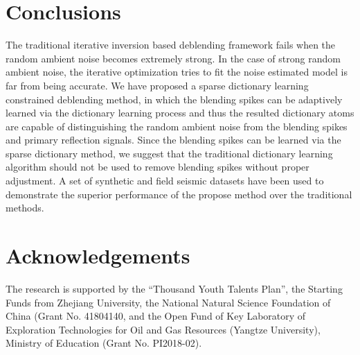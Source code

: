 \section{Conclusions}
The traditional iterative inversion based deblending framework fails when the random ambient noise becomes extremely strong. In the case of strong random ambient noise, the iterative optimization tries to fit the noise estimated model is far from being accurate. We have proposed a sparse dictionary learning constrained deblending method, in which the blending spikes can be adaptively learned via the dictionary learning process and thus the resulted dictionary atoms are capable of distinguishing the random ambient noise from the blending spikes and primary reflection signals. Since the blending spikes can be learned via the sparse dictionary method, we suggest that the traditional dictionary learning algorithm should not be used to remove blending spikes without proper adjustment. A set of synthetic and field seismic datasets have been used to demonstrate the superior performance of the propose method over the traditional methods. 


\section{Acknowledgements}
The research is supported by the “Thousand Youth Talents Plan”, the Starting Funds from Zhejiang University, the National Natural Science Foundation of China (Grant No. 41804140, and the Open Fund of Key Laboratory of Exploration Technologies for Oil and Gas Resources (Yangtze University), Ministry of Education (Grant No. PI2018-02). 












